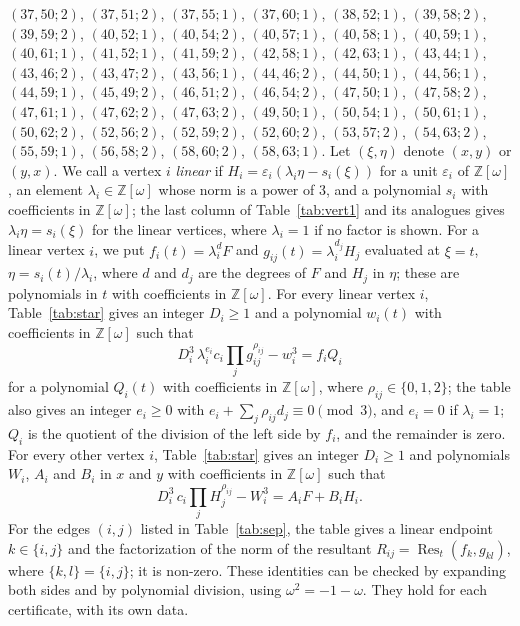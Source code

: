 \documentclass[11pt]{article}
\newcommand{\Z}{\mathbb{Z}}
\begin{document}
$(37,50;2)$, $(37,51;2)$, $(37,55;1)$, $(37,60;1)$, $(38,52;1)$, $(39,58;2)$, $(39,59;2)$, $(40,52;1)$, $(40,54;2)$, $(40,57;1)$, $(40,58;1)$, $(40,59;1)$, $(40,61;1)$, $(41,52;1)$, $(41,59;2)$, $(42,58;1)$, $(42,63;1)$, $(43,44;1)$, $(43,46;2)$, $(43,47;2)$, $(43,56;1)$, $(44,46;2)$, $(44,50;1)$, $(44,56;1)$, $(44,59;1)$, $(45,49;2)$, $(46,51;2)$, $(46,54;2)$, $(47,50;1)$, $(47,58;2)$, $(47,61;1)$, $(47,62;2)$, $(47,63;2)$, $(49,50;1)$, $(50,54;1)$, $(50,61;1)$, $(50,62;2)$, $(52,56;2)$, $(52,59;2)$, $(52,60;2)$, $(53,57;2)$, $(54,63;2)$, $(55,59;1)$, $(56,58;2)$, $(58,60;2)$, $(58,63;1)$.
Let $(\xi,\eta)$ denote $(x,y)$ or $(y,x)$. We call a vertex $i$ \emph{linear} if $H_i=\varepsilon_i(\lambda_i\eta-s_i(\xi))$ for a unit $\varepsilon_i$ of $\Z[\omega]$, an element $\lambda_i\in\Z[\omega]$ whose norm is a power of $3$, and a polynomial $s_i$ with coefficients in $\Z[\omega]$; the last column of Table~\ref{tab:vert1} and its analogues gives $\lambda_i\eta=s_i(\xi)$ for the linear vertices, where $\lambda_i=1$ if no factor is shown. For a linear vertex $i$, we put $f_i(t)=\lambda_i^{d}F$ and $g_{ij}(t)=\lambda_i^{d_j}H_j$ evaluated at $\xi=t$, $\eta=s_i(t)/\lambda_i$, where $d$ and $d_j$ are the degrees of $F$ and $H_j$ in $\eta$; these are polynomials in $t$ with coefficients in $\Z[\omega]$.
For every linear vertex $i$, Table~\ref{tab:star} gives an integer $D_i\geq1$ and a polynomial $w_i(t)$ with coefficients in $\Z[\omega]$ such that
\begin{equation}\label{eq:starlin}
D_i^3\,\lambda_i^{e_i}c_i\prod_jg_{ij}^{\rho_{ij}}-w_i^3=f_iQ_i
\end{equation}
for a polynomial $Q_i(t)$ with coefficients in $\Z[\omega]$, where $\rho_{ij}\in\{0,1,2\}$; the table also gives an integer $e_i\geq0$ with $e_i+\sum_j\rho_{ij}d_j\equiv0\pmod3$, and $e_i=0$ if $\lambda_i=1$; $Q_i$ is the quotient of the division of the left side by $f_i$, and the remainder is zero.
For every other vertex $i$, Table~\ref{tab:star} gives an integer $D_i\geq1$ and polynomials $W_i$, $A_i$ and $B_i$ in $x$ and $y$ with coefficients in $\Z[\omega]$ such that
\begin{equation}\label{eq:star}
D_i^3\,c_i\prod_jH_j^{\rho_{ij}}-W_i^3=A_iF+B_iH_i.
\end{equation}
For the edges $(i,j)$ listed in Table~\ref{tab:sep}, the table gives a linear endpoint $k\in\{i,j\}$ and the factorization of the norm of the resultant $R_{ij}=\operatorname{Res}_t(f_k,g_{kl})$, where $\{k,l\}=\{i,j\}$; it is non-zero.
These identities can be checked by expanding both sides and by polynomial division, using $\omega^2=-1-\omega$. They hold for each certificate, with its own data.
\end{document}
